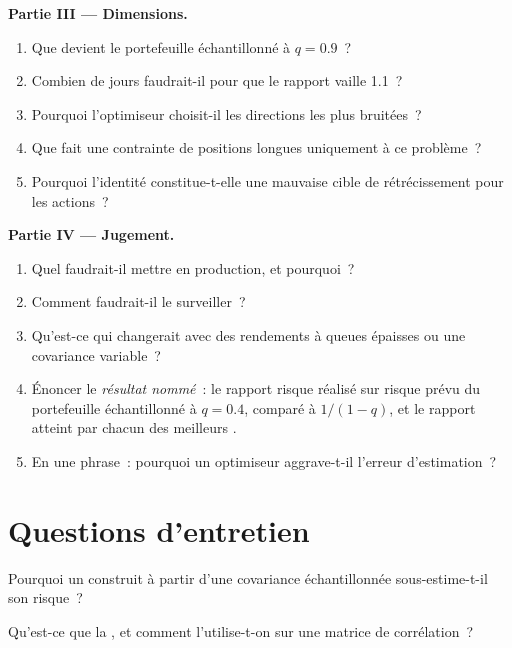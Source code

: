 \begin{problem}
\medskip\noindent\textbf{Partie III --- Dimensions.}
\begin{enumerate}[resume]
\item Que devient le portefeuille échantillonné à $q = 0.9$~?
\item Combien de jours faudrait-il pour que le rapport vaille 1.1~?
\item Pourquoi l'optimiseur choisit-il les directions les plus bruitées~?
\item Que fait une contrainte de positions longues uniquement à ce problème~?
\item Pourquoi l'identité constitue-t-elle une mauvaise cible de rétrécissement pour les actions~?
\end{enumerate}

\medskip\noindent\textbf{Partie IV --- Jugement.}
\begin{enumerate}[resume]
\item Quel  faudrait-il mettre en production, et pourquoi~?
\item Comment faudrait-il le surveiller~?
\item Qu'est-ce qui changerait avec des rendements à queues épaisses ou une covariance variable~?
\item Énoncer le \emph{résultat nommé}~: le rapport risque réalisé sur risque prévu du portefeuille échantillonné à $q = 0.4$, comparé à $1/(1 - q)$, et le rapport atteint par chacun des meilleurs .
\item En une phrase~: pourquoi un optimiseur aggrave-t-il l'erreur d'estimation~?
\end{enumerate}
\end{problem}

\section{Questions d'entretien}

\begin{interviewq}\label{iq:qm:covariance-estimation-and-random-matrices:1}
Pourquoi un  construit à partir d'une covariance échantillonnée sous-estime-t-il son risque~?
\end{interviewq}

\begin{interviewq}\label{iq:qm:covariance-estimation-and-random-matrices:2}
Qu'est-ce que la , et comment l'utilise-t-on sur une matrice de corrélation~?
\end{interviewq}

